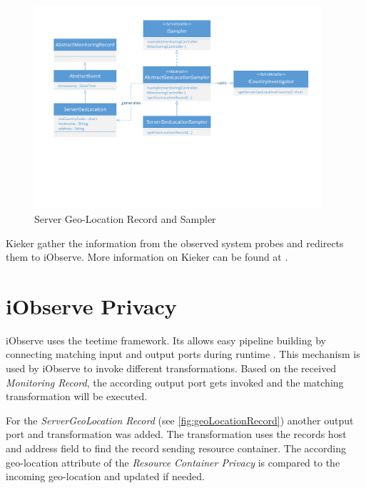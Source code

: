 \begin{figure}[h]
	\centering
	\includegraphics[trim = 20mm 70mm 20mm 20mm, clip, width=0.95\textwidth]{graphs/GeoLocationRecord}
	\caption{Server Geo-Location Record and Sampler}
	\label{fig:geoLocationRecord}
\end{figure}

Kieker gather the information from the observed system probes and redirects them to iObserve. More information on Kieker can be found at \cite{kieker.web}.

\section{iObserve Privacy}
\label{sec:iObserve:privacy}

iObserve uses the teetime framework. Its allows easy pipeline building by connecting matching input and output ports during runtime \cite{teetime.16.05.2017}. This mechanism is used by iObserve to invoke different transformations. Based on the received \textit{Monitoring Record}, the according output port gets invoked and the matching transformation will be executed.

For the \textit{ServerGeoLocation Record} (see \autoref{fig:geoLocationRecord}) another output port and transformation was added. The transformation uses the records host and address field to find the record sending resource container. The according geo-location attribute of the \textit{Resource Container Privacy} is compared to the incoming geo-location and updated if needed.

